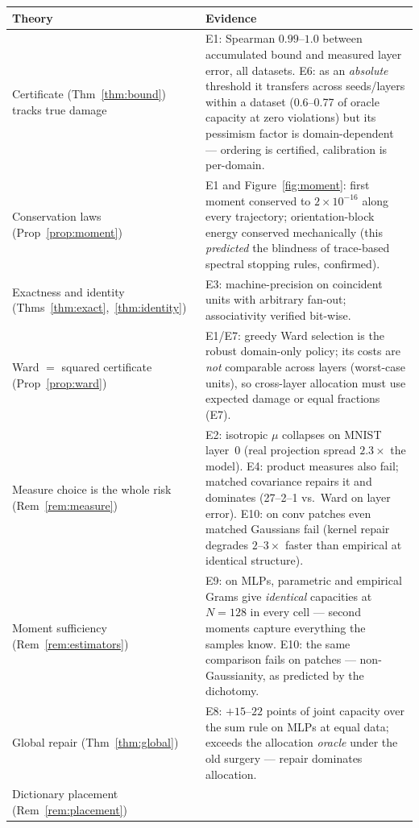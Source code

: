\documentclass[11pt]{article}
\theoremstyle{remark}
\begin{document}
\begin{center}
\small
\begin{tabular}{@{}p{}p{}@{}}
\toprule
Theory & Evidence \\
\midrule
Certificate (Thm~\ref{thm:bound}) tracks true damage &
E1: Spearman $0.99$--$1.0$ between accumulated bound and measured layer
error, all datasets. E6: as an \emph{absolute} threshold it transfers across
seeds/layers within a dataset (0.6--0.77 of oracle capacity at zero
violations) but its pessimism factor is domain-dependent --- ordering is
certified, calibration is per-domain. \\[2pt]
Conservation laws (Prop~\ref{prop:moment}) &
E1 and Figure~\ref{fig:moment}: first moment conserved to $2\times10^{-16}$
along every trajectory; orientation-block energy conserved mechanically (this \emph{predicted} the blindness of trace-based
spectral stopping rules, confirmed). \\[2pt]
Exactness and identity (Thms~\ref{thm:exact},~\ref{thm:identity}) &
E3: machine-precision on coincident units with arbitrary fan-out;
associativity verified bit-wise. \\[2pt]
Ward $=$ squared certificate (Prop~\ref{prop:ward}) &
E1/E7: greedy Ward selection is the robust domain-only policy; its costs are
\emph{not} comparable across layers (worst-case units), so cross-layer
allocation must use expected damage or equal fractions (E7). \\[2pt]
Measure choice is the whole risk (Rem~\ref{rem:measure}) &
E2: isotropic $\mu$ collapses on MNIST layer~0 (real projection spread
$2.3\times$ the model). E4: product measures also fail; matched covariance
repairs it and dominates (27--2--1 vs.\ Ward on layer error). E10: on conv
patches even matched Gaussians fail (kernel repair degrades $2$--$3\times$
faster than empirical at identical structure). \\[2pt]
Moment sufficiency (Rem~\ref{rem:estimators}) &
E9: on MLPs, parametric and empirical Grams give \emph{identical} capacities
at $N{=}128$ in every cell --- second moments capture everything the samples
know. E10: the same comparison fails on patches --- non-Gaussianity, as
predicted by the dichotomy. \\[2pt]
Global repair (Thm~\ref{thm:global}) &
E8: $+15$--$22$ points of joint capacity over the sum rule on MLPs at equal
data; exceeds the allocation \emph{oracle} under the old surgery ---
repair dominates allocation. \\[2pt]
Dictionary placement (Rem~\ref{rem:placement}) &

\end{tabular}
\end{center}
\end{document}

